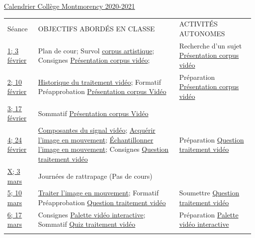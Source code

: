 \documentclass[
  french,
]{book}
\begin{document}
\href{https://www.cmontmorency.qc.ca/wp-content/uploads/images/college/administration/CALENDRIER-SCOLAIRE-2020-2021.pdf}{Calendrier Collège Montmorency 2020-2021}

\begin{longtable}[]{@{}
  >{\raggedright\arraybackslash}p{}
  >{\raggedright\arraybackslash}p{}
  >{\raggedright\arraybackslash}p{}@{}}
\toprule
Séance & OBJECTIFS ABORDÉS EN CLASSE & ACTIVITÉS AUTONOMES \\ \addlinespace
\midrule
\endhead
\protect\hyperlink{semaine_1}{1;
3
février} & Plan de cour;
Survol \protect\hyperlink{corpus}{corpus artistique};
Consignes \protect\hyperlink{sommatif_1}{Présentation corpus
vidéo}; & Recherche d'un sujet \protect\hyperlink{sommatif_1}{Présentation corpus
vidéo} \\ \addlinespace
\protect\hyperlink{semaine_2}{2;
10
février} & \protect\hyperlink{evolution_historique}{Historique du traitement
vidéo};
Formatif Préapprobation \protect\hyperlink{sommatif_1}{Présentation corpus
Vidéo} & Préparation \protect\hyperlink{sommatif_1}{Présentation corpus
vidéo} \\ \addlinespace
\protect\hyperlink{semaine_3}{3;
17
février} & Sommatif \protect\hyperlink{sommatif_1}{Présentation corpus
Vidéo} & \\ \addlinespace
\protect\hyperlink{semaine_4}{4;
24
février} & \protect\hyperlink{lexique}{Composantes du signal vidéo};
\protect\hyperlink{acquerir}{Acquérir l'image en mouvement};
\protect\hyperlink{echantillonner}{Échantillonner l'image en
mouvement};
Consignes \protect\hyperlink{sommatif_2}{Question traitement
vidéo} & Préparation \protect\hyperlink{sommatif_2}{Question traitement
vidéo} \\ \addlinespace
\protect\hyperlink{semaine_5}{X;
3
mars} & Journées de rattrapage (Pas de cours) & \\ \addlinespace
\protect\hyperlink{semaine_6}{5;
10
mars} & \protect\hyperlink{traiter}{Traiter l'image en mouvement};
Formatif Préapprobation \protect\hyperlink{sommatif_2}{Question traitement
vidéo} & Soumettre \protect\hyperlink{sommatif_2}{Question traitement
vidéo} \\ \addlinespace
\protect\hyperlink{semaine_7}{6;
17
mars} & Consignes \protect\hyperlink{sommatif_4}{Palette vidéo
interactive};
Sommatif \protect\hyperlink{sommatif_3}{Quiz traitement vidéo} & Préparation \protect\hyperlink{sommatif_4}{Palette vidéo
interactive} \\ \addlinespace

\end{longtable}
\end{document}
